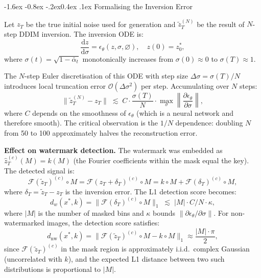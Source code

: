 \documentclass[10pt,twocolumn]{article}
\makeatletter
\renewcommand\subsection{\@startsection{subsection}{2}{\z@}%
  {-1.6ex \@plus -0.8ex \@minus -.2ex}{0.4ex \@plus .1ex}%
  {\normalfont\normalsize\itshape}}
\makeatother
\begin{document}
\subsection{Formalising the Inversion Error}

Let $z_T$ be the true initial noise used for generation and
$\tilde{z}_T^{(N)}$ be the result of $N$-step DDIM inversion.
The inversion ODE is:
\begin{equation}
  \frac{\mathrm{d} z}{\mathrm{d} \sigma} = \epsilon_\theta(z, \sigma, \varnothing),
  \quad z(0) = z_0^*,
  \label{eq:inversion_ode}
\end{equation}
where $\sigma(t) = \sqrt{1-\bar\alpha_t}$ monotonically increases
from $\sigma(0) \approx 0$ to $\sigma(T) \approx 1$.

The $N$-step Euler discretisation of this ODE with step size
$\Delta\sigma = \sigma(T)/N$ introduces local truncation error
$\mathcal{O}(\Delta\sigma^2)$ per step.
Accumulating over $N$ steps:
\begin{equation}
  \|\tilde{z}_T^{(N)} - z_T\|
    \;\lesssim\; C \cdot \frac{\sigma(T)}{N}
    \cdot \max_{\sigma}\!\left\|\frac{\partial \epsilon_\theta}{\partial \sigma}\right\|,
  \label{eq:euler_error}
\end{equation}
where $C$ depends on the smoothness of $\epsilon_\theta$ (which is
a neural network and therefore smooth).
The critical observation is the $1/N$ dependence: doubling $N$ from
50 to 100 approximately halves the reconstruction error.

\textbf{Effect on watermark detection.}
The watermark was embedded as $\hat{z}_T^{(c)}(M) = k(M)$ (the Fourier
coefficients within the mask equal the key).
The detected signal is:
\begin{equation}
  \mathcal{F}(\tilde{z}_T)^{(c)} \circ M
    = \mathcal{F}(z_T + \delta_T)^{(c)} \circ M
    = k \circ M + \mathcal{F}(\delta_T)^{(c)} \circ M,
\end{equation}
where $\delta_T = \tilde{z}_T - z_T$ is the inversion error.
The L1 detection score becomes:
\begin{equation}
  d_w(x^*,k) = \|\mathcal{F}(\delta_T)^{(c)} \circ M\|_1
    \;\lesssim\; |M| \cdot C/N \cdot \kappa,
  \label{eq:dw_bound}
\end{equation}
where $|M|$ is the number of masked bins and $\kappa$ bounds
$\|\partial\epsilon_\theta/\partial\sigma\|$.
For non-watermarked images, the detection score satisfies:
\begin{equation}
  d_{\mathrm{nw}}(x^*,k) = \|\mathcal{F}(\tilde{z}_T)^{(c)} \circ M
    - k \circ M\|_1 \approx \frac{|M| \cdot \pi}{2},
\end{equation}
since $\mathcal{F}(\tilde{z}_T)^{(c)}$ in the mask region is
approximately i.i.d.\ complex Gaussian (uncorrelated with $k$),
and the expected L1 distance between two such distributions is
proportional to $|M|$.
\end{document}

